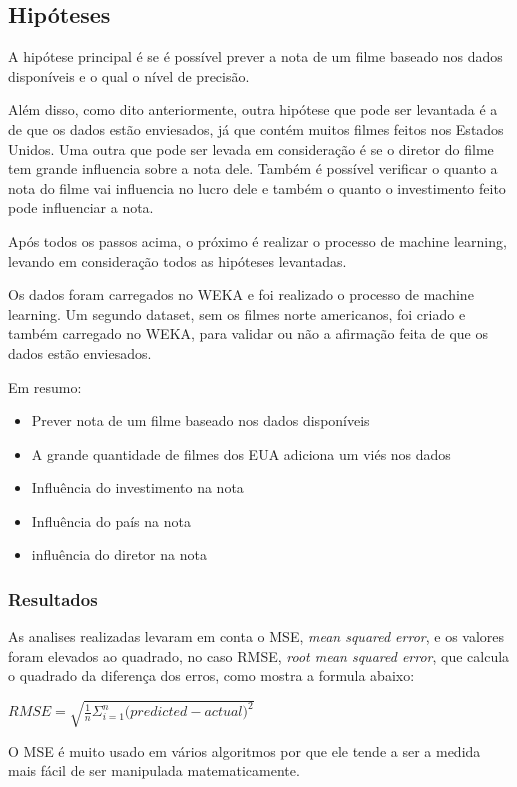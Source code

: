 \subsection{Hipóteses}
A hipótese principal é se é possível prever a nota de um filme baseado nos dados disponíveis e o qual o nível de precisão.

Além disso, como dito anteriormente, outra hipótese que pode ser levantada é a de que os dados estão enviesados, já que contém muitos filmes feitos nos Estados Unidos. Uma outra que pode ser levada em consideração é se o diretor do filme tem grande influencia sobre a nota dele. Também é possível verificar o quanto a nota do filme vai influencia no lucro dele e também o quanto o investimento feito pode influenciar a nota.

Após todos os passos acima, o próximo é realizar o processo de machine learning, levando em consideração todos as hipóteses levantadas. 

Os dados foram carregados no WEKA e foi realizado o processo de machine learning. Um segundo dataset, sem os filmes norte americanos, foi criado e também carregado no WEKA, para validar ou não a afirmação feita de que os dados estão enviesados. 

Em resumo:

\begin{itemize}
    \item Prever nota de um filme baseado nos dados disponíveis
    \item A grande quantidade de filmes dos EUA adiciona um viés nos dados
    \item Influência do investimento na nota
    \item Influência do país na nota
    \item influência do diretor na nota
\end{itemize}

\subsubsection{Resultados}
As analises realizadas levaram em conta o MSE, \textit{mean squared error}, e os valores foram elevados ao quadrado, no caso RMSE, \textit{root mean squared error}, que calcula o quadrado da diferença dos erros, como mostra a formula abaixo:

$RMSE = \sqrt{\frac{1}{n}\Sigma_{i=1}^{n}{\Big({predicted-actual}\Big)^2}}$
 
O MSE é muito usado em vários algoritmos por que ele tende a ser a medida mais fácil de ser manipulada matematicamente.

